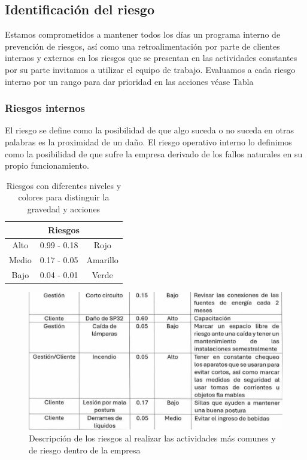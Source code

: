     \subsection{Identificación del riesgo}
    Estamos comprometidos a mantener todos los días un programa interno de prevención de riesgos, así como una retroalimentación por parte de clientes internos y externos en los riesgos que se presentan en las actividades constantes por su parte invitamos a utilizar el equipo de trabajo.
    Evaluamos a cada riesgo interno por un rango para dar prioridad en las acciones véase Tabla
    \subsubsection{Riesgos internos}
    
    El riesgo se define como la posibilidad de que algo suceda o no suceda en otras palabras es la proximidad de un daño. 
    El riesgo operativo interno lo definimos como la posibilidad de que sufre la empresa derivado de los fallos naturales en su propio funcionamiento.
    \begin{table}[h]
        \centering
        \caption{Riesgos con diferentes niveles y colores para distinguir la gravedad y acciones}
        \begin{tabular}{|c| c| c|}
        \hline
        \multicolumn{3}{|c|}{Riesgos}\\
        \hline
             Alto& 0.99 - 0.18 & Rojo  \\
        \hline     
             Medio& 0.17 - 0.05 & Amarillo \\
        \hline
             Bajo& 0.04 - 0.01 & Verde \\
        \hline
        \end{tabular}
        \label{tab:Riesgos}
    \end{table}
    \begin{figure}[H]
        \centering
        \includegraphics[trim = {1mm 1mm 1mm 1mm},clip,scale=0.3]{8/Img/Riesgos0.pdf}
        \caption{Descripción de los riesgos al realizar las actividades más comunes y de riesgo dentro de la empresa}
        \label{Riesgos internos}
    \end{figure}
